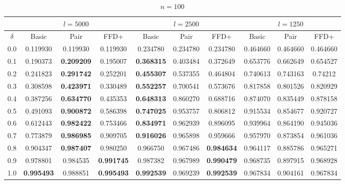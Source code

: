 \documentclass[oribibl]{llncs}
\begin{document}
\begin{table}[!htb]
\centering
\caption{$n = 100$}
\begin{tabular}{c@{\hspace{15pt}}c@{\hspace{10pt}}c@{\hspace{10pt}}c@{\hspace{7pt}}| @{\hspace{7pt}}c@{\hspace{10pt}}c@{\hspace{10pt}}c@{\hspace{7pt}}| @{\hspace{7pt}} c@{\hspace{10pt}}c@{\hspace{10pt}}c}
	\noalign{\smallskip}
	& \multicolumn{3}{c}{$l = 5000$} & \multicolumn{3}{c}{$l = 2500$} & \multicolumn{3}{c}{$l = 1250$} \\
	\hline\noalign{\smallskip}
	$\delta$ & Basic & Pair & FFD+ & Basic & Pair & FFD+ & Basic & Pair & FFD+ \\
	\noalign{\smallskip}
	\hline 
	\noalign{\smallskip}
	0.0 & 0.119930 & 0.119930 & 0.119930 & 0.234780 & 0.234780 & 0.234780 & 0.464660 & 0.464660 & 0.464660 \\
	0.1 & 0.190373 & \textbf{0.209209} & 0.195007 & \textbf{0.368315} & 0.403484 & 0.372649 & 0.653776 & 0.662649 & 0.654527 \\
	0.2 & 0.241823 & \textbf{0.291742} & 0.252201 & \textbf{0.455307} & 0.537355 & 0.464804 & 0.740613 & 0.743163 & 0.74212 \\
	0.3 & 0.308598 & \textbf{0.423971} & 0.330489 & \textbf{0.552257} & 0.700541 & 0.573676 & 0.817858 & 0.801526 & 0.820929 \\
	0.4 & 0.387256 & \textbf{0.634770} & 0.435353 & \textbf{0.648313} & 0.860270 & 0.688716 & 0.874070 & 0.835449 & 0.878158 \\
	0.5 & 0.491093 & \textbf{0.900872} & 0.586398 & \textbf{0.747025} & 0.953757 & 0.806812 & 0.915534 & 0.854677 & 0.920727 \\
	0.6	& 0.612443 & \textbf{0.982422} & 0.753466 & \textbf{0.834971} & 0.962939 & 0.896095 & 0.939964 & 0.864190 & 0.945036 \\
	0.7 & 0.773879 & \textbf{0.986985} & 0.909705 & \textbf{0.916026} & 0.965898 & 0.959666 & 0.957970 & 0.873854 & 0.961036 \\
	0.8	& 0.904347 & \textbf{0.987407} & 0.980250 & 0.966750 & 0.967486 & \textbf{0.984634} & 0.964117 & 0.885786 & 0.965271 \\
	0.9	& 0.978801 & 0.984535 &	\textbf{0.991745} & 0.987382 & 0.967989 & \textbf{0.990479} & 0.968735 & 0.897915 & 0.968928 \\
	1.0 & \textbf{0.995493} & 0.988851 & \textbf{0.995493} & \textbf{0.992539} & 0.969239 & \textbf{0.992539} & 0.967834 & 0.904161 & 0.967834 \\
	\hline
\end{tabular}
\label{table:n100}
\end{table}	
\end{document}
